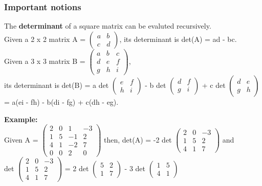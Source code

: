 \subsubsection* {Important notions}
The \textbf{determinant} of a square matrix can be evaluted recursively.\\
Given a 2 x 2 matrix A = $\begin{pmatrix}
    a & b \\
    c & d
\end{pmatrix}$, its determinant is det(A) = ad - bc.\\
Given a 3 x 3 matrix B = $\begin{pmatrix}
    a & b & c \\
    d & e & f \\
    g & h & i
\end{pmatrix}$, \\ its determinant is det(B) = a det $\begin{pmatrix}
    e & f \\
    h & i
\end{pmatrix}$ - b det $\begin{pmatrix}
    d & f \\
    g & i
\end{pmatrix}$ + c det $\begin{pmatrix}
    d & e \\
    g & h
\end{pmatrix}$ = a(ei - fh) - b(di - fg) + c(dh - eg).\\
\bigskip 

\noindent
\textbf{Example:}\\
Given A = $\begin{pmatrix}
    2 & 0 & 1 & -3\\
    1 & 5 & -1 & 2\\
    4 & 1 & -2 & 7\\
    0 & 0 & 2 & 0
\end{pmatrix}$ then,
det(A) = -2 det $\begin{pmatrix}
    2 & 0 & -3 \\
    1 & 5 & 2 \\
    4 & 1 & 7
\end{pmatrix}$ and \\
det $\begin{pmatrix}
    2 & 0 & -3 \\
    1 & 5 & 2 \\
    4 & 1 & 7
\end{pmatrix}$ = 2 det $\begin{pmatrix}
    5 & 2 \\
    1 & 7
\end{pmatrix}$ - 3 det $\begin{pmatrix}
    1 & 5 \\
    4 & 1
\end{pmatrix}$ 
\bigskip

